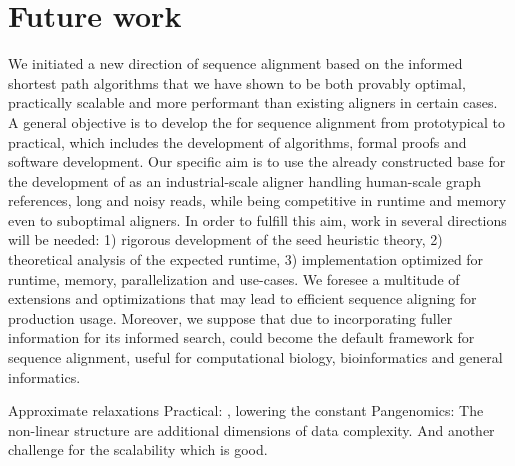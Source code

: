 \section*{Future work}

We initiated a new direction of sequence alignment based on the informed
shortest path algorithms \A that we have shown to be both provably optimal,
practically scalable and more performant than existing aligners in certain
cases. A general objective is to develop the \A for sequence alignment from
prototypical to practical, which includes the development of algorithms, formal
proofs and software development. Our specific aim is to use the already
constructed base for the development of \astarix as an industrial-scale aligner
handling human-scale graph references, long and noisy reads, while being
competitive in runtime and memory even to suboptimal aligners. In order to
fulfill this aim, work in several directions will be needed: 1) rigorous
development of the seed heuristic theory, 2) theoretical analysis of the
expected runtime, 3) implementation optimized for runtime, memory,
parallelization and use-cases. We foresee a multitude of extensions and
optimizations that may lead to efficient sequence aligning for production usage.
Moreover, we suppose that due to incorporating fuller information for its
informed search, \A could become the default framework for sequence alignment,
useful for computational biology, bioinformatics and general informatics.

Approximate relaxations
Practical: , lowering the \A constant
Pangenomics: The non-linear structure are additional dimensions of data complexity. And
another challenge for the scalability which is good.

